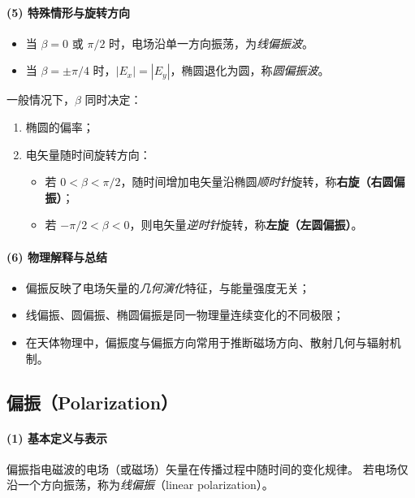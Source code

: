 \paragraph{(5) 特殊情形与旋转方向}
\begin{itemize}[leftmargin=2em]
  \item 当 $\beta=0$ 或 $\pi/2$ 时，电场沿单一方向振荡，为\emph{线偏振波}。
  \item 当 $\beta=\pm\pi/4$ 时，$|E_x|=|E_y|$，椭圆退化为圆，称\emph{圆偏振波}。
\end{itemize}

一般情况下，$\beta$ 同时决定：
\begin{enumerate}[leftmargin=2em]
  \item 椭圆的偏率；
  \item 电矢量随时间旋转方向：
  \begin{itemize}
    \item 若 $0<\beta<\pi/2$，随时间增加电矢量沿椭圆\emph{顺时针}旋转，称\textbf{右旋（右圆偏振）}；
    \item 若 $-\pi/2<\beta<0$，则电矢量\emph{逆时针}旋转，称\textbf{左旋（左圆偏振）}。
  \end{itemize}
\end{enumerate}

\paragraph{(6) 物理解释与总结}
\begin{itemize}[leftmargin=2em]
  \item 偏振反映了电场矢量的\emph{几何演化}特征，与能量强度无关；
  \item 线偏振、圆偏振、椭圆偏振是同一物理量连续变化的不同极限；
  \item 在天体物理中，偏振度与偏振方向常用于推断磁场方向、散射几何与辐射机制。
\end{itemize}

\subsection{偏振（Polarization）}

\paragraph{(1) 基本定义与表示}
偏振指电磁波的电场（或磁场）矢量在传播过程中随时间的变化规律。
若电场仅沿一个方向振荡，称为\emph{线偏振}（linear polarization）。

